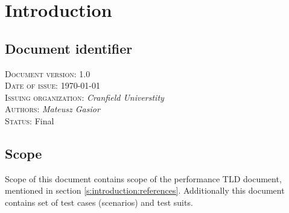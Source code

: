 \chapter{Introduction} \label{chp:introduction}
	\begin{comment}
		Introduce the following subordinate sections. This section identifies the issuing organization and the
		details of issuance. It includes required approvals and status (DRAFT/FINAL) of the document. It is
		here that the scope is described and references identified.
	\end{comment}

\section{Document identifier} \label{s:introduction:document-identifier}
	\begin{comment}
		Uniquely identify a version of the document by including information such as the date of issue, the
		issuing organization, the author(s), the approval signatures (possibly electronic), and the status/version
		(e.g., draft, reviewed, corrected, or final). Identifying information may also include the reviewers and
		pertinent managers. This information is commonly put on an early page in the document, such as the
		cover page or the pages immediately following it. Some organizations put this information at the end
		of the document. This information may also be kept in a place other than in the text of the document
		(e.g., in the configuration management system or in the header or footer of the document).
	\end{comment}
	\textsc{Document version: } 1.0 \\
	\textsc{Date of issue:} \today \\
	\textsc{Issuing organization:} \textit{Cranfield Universtity} \\
	\textsc{Authors: } \textit{Mateusz Gasior} \\
	\textsc{Status: } Final \\
\section{Scope} \label{s:introduction:scope}
	\begin{comment}
		Identify the test items (software or system) that are the object of testing, e.g., specific attributes of the
		software, the installation instructions, the user instructions, interfacing hardware, database conversion
		software that is not a part of the operational system) including their version/revision level. Also
		identify any procedures for their transfer from other environments to the test environment.
		Supply references to the test item documentation relevant to an individual level of test, if it exists, such
		as follows:
		⎯ Requirements
		⎯ Design
		⎯ User’s guide
		⎯ Operations guide
		⎯ Installation guide
		Reference any Anomaly Reports relating to the test items.
		Identify any items that are to be specifically excluded from testing.
	\end{comment}
	Scope of this document contains scope of the performance \gls{TLD} document, mentioned in section \ref{s:introduction:references}. Additionally this document contains set of test cases (scenarios) and test suits.
